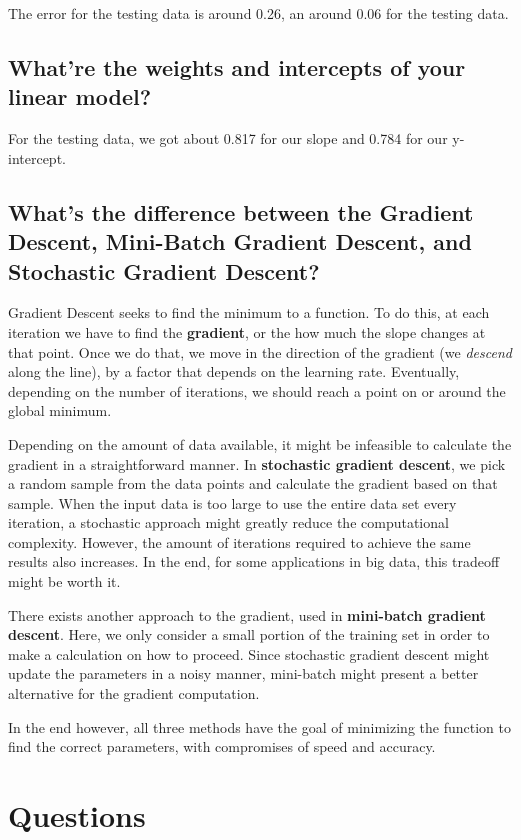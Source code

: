\documentclass{article}
\begin{document}
				The error for the testing data  is around 0.26, an around 0.06 for 
				the testing data.
		\subsection{What're the weights and intercepts of your linear model?}

				For the testing data, we got about 0.817 for our slope and 0.784 for our 
				y-intercept.

		\subsection{What's the difference between the Gradient Descent, Mini-Batch Gradient
				Descent, and Stochastic Gradient Descent?}
				
				Gradient Descent seeks to find the minimum to a function. To do this, at each 
				iteration we have to find the \textbf{gradient}, or the how much the slope changes
				at that point. Once we do that, we move in the direction of the gradient (we 
				\textit{descend} along the line), by a factor that depends on the learning rate.
				Eventually, depending on the number of iterations, we should reach a point 
				on or around the global minimum.

				Depending on the amount of data available, it might be infeasible to calculate
				the gradient in a straightforward manner. In \textbf{stochastic gradient descent},
				we pick a random sample from the data points and calculate the gradient based on that
				sample. When the input data is too large to use the entire data set every iteration,
				a stochastic approach might greatly reduce the computational complexity. However,
				the amount of iterations required to achieve the same results also increases. In the end,
				for some applications in big data, this tradeoff might be worth it.

				There exists another approach to the gradient, used in \textbf{mini-batch gradient descent}.
				Here, we only consider a small portion of the training set in  order to make a calculation
				on how to proceed. Since stochastic gradient descent might update the parameters in a noisy 
				manner, mini-batch might present a better alternative for the gradient computation.

				In the end however, all three methods have the goal of minimizing the function to find the 
				correct parameters, with compromises of speed and accuracy.


\section{Questions}
\end{document}
